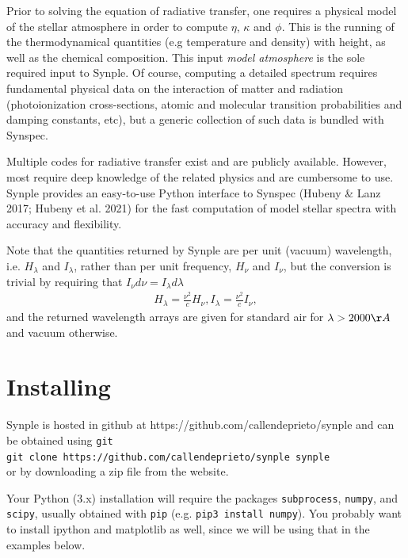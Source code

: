 \documentclass[]{article}
\begin{document}
Prior to solving the equation of radiative transfer, one requires a physical model of the stellar atmosphere in order to compute $\eta$, $\kappa$ and $\phi$. This is the running of the thermodynamical quantities (e.g temperature and density) with height, as well as the chemical composition. This input {\it model atmosphere} is the sole required input to Synple.  Of course, computing a detailed spectrum requires fundamental physical data on the interaction of matter and radiation (photoionization cross-sections, atomic and molecular transition probabilities and damping constants, etc), but a generic collection of such data is bundled with Synspec.

Multiple codes for radiative transfer exist and are publicly available. However, most require deep knowledge of the related physics and are cumbersome to use. Synple provides an easy-to-use Python interface to Synspec (Hubeny \& Lanz 2017; Hubeny et al. 2021) for the fast computation of model stellar spectra with accuracy and flexibility. 

Note that the quantities returned by Synple are 
per unit (vacuum) wavelength, i.e. $H_{\lambda}$ and $I_{\lambda}$, 
rather than per unit frequency, $H_{\nu}$ and $I_{\nu}$, but the conversion 
is trivial by requiring that $I_{\nu} d\nu = I_{\lambda} d\lambda$
\begin{eqnarray}
  H_{\lambda} = \frac{\nu^2}{c} H_{\nu}, 
  I_{\lambda} = \frac{\nu^2}{c} I_{\nu},
\end{eqnarray}
and the returned wavelength arrays are given for standard air 
for $\lambda > 2000 \AA$ and 
 vacuum otherwise.



\section{Installing}

Synple is hosted in github at https://github.com/callendeprieto/synple
and can be obtained using {\tt git} 
\\ {\tt git clone https://github.com/callendeprieto/synple synple} \\
\noindent or by downloading a zip file from the website.

Your Python (3.x) installation  will require the packages {\tt subprocess}, {\tt numpy}, and {\tt scipy}, usually obtained with {\tt pip} (e.g. {\tt pip3 install numpy}). You probably want to install ipython and matplotlib as well, since we will be using that in the examples below. 
\end{document}
